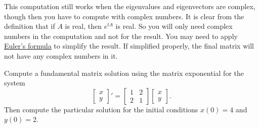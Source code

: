 This computation still works when the eigenvalues and
eigenvectors are complex, though then you have to compute with complex
numbers.  It is clear from the definition that if $A$ is real,
then $e^{tA}$ is real.  So you will only need complex numbers in the
computation and not for the result.  You may need to apply
\hyperref[eulersformula]{Euler's formula} to simplify the
result.  If simplified properly, the final matrix will not have any complex
numbers in it.

\begin{example}
Compute a fundamental matrix solution using the matrix exponential
for the system
\begin{equation*}
\begin{bmatrix}
x \\ y
\end{bmatrix} '
=
\begin{bmatrix}
1 & 2 \\
2 & 1
\end{bmatrix}
\begin{bmatrix}
x \\ y
\end{bmatrix} .
\end{equation*}
Then compute the particular solution for the initial conditions
$x(0) = 4$ and $y(0) = 2$.


\end{example}
